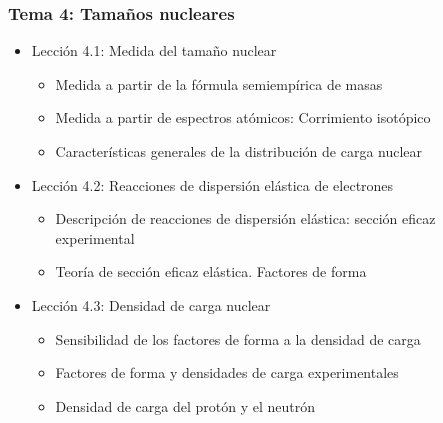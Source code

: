 \documentclass[a4paper,12pt,twoside]{article}
\begin{document}
\subsubsection*{Tema 4: Tamaños nucleares}
\begin{itemize}
\item Lección 4.1: Medida del tamaño nuclear
\begin{itemize}
\item Medida a partir de la fórmula semiempírica de masas
\item Medida a partir de espectros atómicos: Corrimiento isotópico
\item Características generales de la distribución de carga nuclear
\end{itemize}
\item Lección 4.2: Reacciones de dispersión elástica de electrones
\begin{itemize}
\item Descripción de reacciones de dispersión elástica: sección eficaz experimental
\item Teoría de sección eficaz elástica. Factores de forma
\end{itemize}
\item Lección 4.3: Densidad de carga nuclear
\begin{itemize}
\item Sensibilidad de los factores de forma a la densidad de carga
\item Factores de forma y densidades de carga experimentales
\item Densidad de carga del protón y el neutrón
\end{itemize}
\end{itemize}
\end{document}
